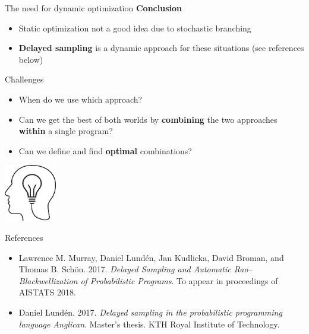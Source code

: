 \documentclass[t]{beamer}
\newlength{\cheight}
\begin{document}
\begin{frame}[fragile]{}
\begin{minipage}[c][\cheight][t]{0.48\linewidth}
\begin{block}{The need for dynamic optimization}
    \textbf{Conclusion}
    \begin{itemize}
      \item Static optimization not a good idea due to stochastic branching
        \vspace{5mm}
      \item \textbf{Delayed sampling} is a dynamic approach for these
        situations (see references below)
    \end{itemize}
  \end{block}
  \vfill

  \begin{block}{Challenges}
    \begin{itemize}
      \item When do we use which approach?

      \item
        \vspace{1cm}
        Can we get the best of both worlds by \textbf{combining} the two
        approaches \textbf{within} a single program?

      \item
        \vspace{1cm}
        Can we define and find \textbf{optimal} combinations?
    \end{itemize}

    \vspace{1cm}
    \begin{center}
      \includegraphics[width=0.17\textwidth]{challenges}
    \end{center}
  \end{block}

  \vfill

  \begin{block}{References}
    \begin{itemize}
      \item
        Lawrence M. Murray, Daniel Lundén, Jan Kudlicka, David Broman, and
        Thomas B. Schön. 2017. \emph{Delayed Sampling and Automatic
        Rao--Blackwellization of Probabilistic Programs}. To appear in
        proceedings of AISTATS 2018.

      \item
        \vspace{1cm}
        Daniel Lundén. 2017. \emph{Delayed sampling in the
        probabilistic programming language Anglican}. Master's thesis. KTH
        Royal Institute of Technology.
    \end{itemize}
  \end{block}

\end{minipage}
\end{frame}
\end{document}
